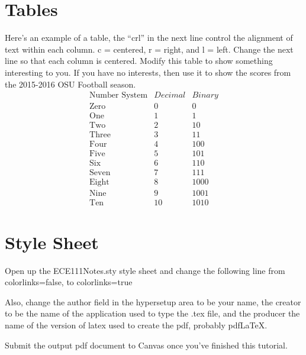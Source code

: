 \documentclass{article}
\begin{document}
\section{Tables}

Here's an example of a table, the ``crl'' in the next line control the alignment of text within each column.  c = centered, r = right, and l = left.  Change the next line so that each column is centered. Modify this table to show something interesting to you.  If you have no interests, then use it to show the scores from the 2015-2016 OSU Football season.
\[ \begin{array}{crl}
\mbox{Number System}    & Decimal   & Binary    \\
\mbox{Zero}	            & 0         & 0         \\
\mbox{One} 	            & 1         & 1         \\
\mbox{Two} 	            & 2         & 10        \\
\mbox{Three}            & 3         & 11  	    \\
\mbox{Four}             & 4         & 100 	    \\
\mbox{Five}             & 5         & 101 	    \\
\mbox{Six}              & 6         & 110 	    \\
\mbox{Seven}            & 7         & 111 	    \\
\mbox{Eight}            & 8         & 1000 	    \\
\mbox{Nine}             & 9         & 1001 	    \\
\mbox{Ten} 	            & 10        & 1010 
\end{array}\] 

\newpage
\section{Style Sheet}
Open up the ECE111Notes.sty style sheet and change the following line from \newline
colorlinks=false,  \newline
to\newline
colorlinks=true\newline

Also, change the author field in the hypersetup area to be your name, the creator to be the name of the application used to type the .tex file, and the producer the name of the version of latex used to create the pdf, probably pdfLaTeX.


\vspace{2 in}
Submit the output pdf document to Canvas once you've finished this tutorial.
\end{document}
